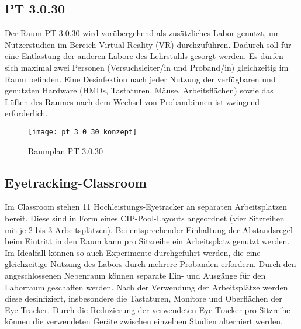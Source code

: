\subsection{PT 3.0.30}\label{subsec:labore_pt3.0.30}


\noindent
Der Raum  PT 3.0.30 wird vorübergehend als zusätzliches Labor genutzt, um Nutzerstudien im Bereich Virtual Reality (VR) durchzuführen.
Dadurch soll für eine Entlastung der anderen Labore des Lehrstuhls gesorgt werden.
Es dürfen sich maximal zwei Personen (Versuchsleiter/in und Proband/in) gleichzeitig im Raum befinden.
Eine Desinfektion nach jeder Nutzung der verfügbaren und genutzten Hardware (HMDs, Tastaturen, Mäuse, Arbeitsflächen) sowie das Lüften des Raumes nach dem Wechsel von Proband:innen ist zwingend erforderlich.

\medskip
\begin{figure}[h]
    \label{fig:raumplan_pt3.0.30}
    \centering
    \texttt{[image: pt\_3\_0\_30\_konzept]}
    \caption{Raumplan PT 3.0.30}
\end{figure}

\subsection{Eyetracking-Classroom}\label{subsec:labore_eyetracking}


\noindent
Im Classroom stehen 11 Hochleistungs-Eyetracker an separaten Arbeitsplätzen bereit.
Diese sind in Form eines CIP-Pool-Layouts angeordnet (vier Sitzreihen mit je 2 bis 3 Arbeitsplätzen).
Bei entsprechender Einhaltung der Abstandsregel beim Eintritt in den Raum kann pro Sitzreihe ein Arbeitsplatz genutzt werden.
Im Idealfall können so auch Experimente durchgeführt werden, die eine gleichzeitige Nutzung des Labors durch mehrere Probanden erfordern.
Durch den angeschlossenen Nebenraum können separate Ein- und Ausgänge für den Laborraum geschaffen werden.
Nach der Verwendung der Arbeitsplätze werden diese desinfiziert, insbesondere die Tastaturen, Monitore und Oberflächen der Eye-Tracker.
Durch die Reduzierung der verwendeten Eye-Tracker pro Sitzreihe können die verwendeten Geräte zwischen einzelnen Studien alterniert werden.

\medskip

